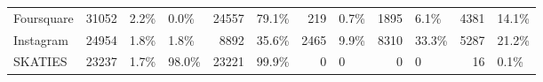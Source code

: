 \begin{tabular}{lrllrlrlrlrl}
Foursquare          &       31052 &        2.2\% &                 0.0\% &             24557 &             79.1\% &               219 &              0.7\% &              1895 &              6.1\% &             4381 &            14.1\% \\
Instagram           &       24954 &        1.8\% &                 1.8\% &              8892 &             35.6\% &              2465 &              9.9\% &              8310 &             33.3\% &             5287 &            21.2\% \\
SKATIES             &       23237 &        1.7\% &                98.0\% &             23221 &             99.9\% &                 0 &                 0 &                 0 &                 0 &               16 &             0.1\% \\
\bottomrule
\end{tabular}
